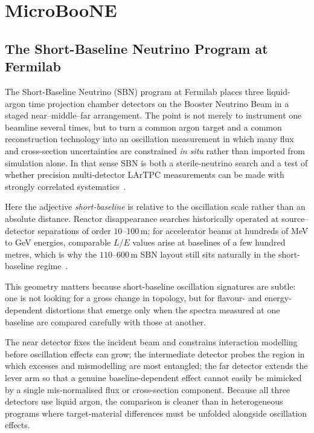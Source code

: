 \chapter{MicroBooNE}

\section{The Short-Baseline Neutrino Program at Fermilab}

The Short-Baseline Neutrino (SBN) program at Fermilab places three liquid-argon
time projection chamber detectors on the Booster Neutrino Beam in a staged
near--middle--far arrangement. The point is not merely to instrument one
beamline several times, but to turn a common argon target and a common
reconstruction technology into an oscillation measurement in which many flux
and cross-section uncertainties are constrained \emph{in situ} rather than
imported from simulation alone. In that sense SBN is both a sterile-neutrino
search and a test of whether precision multi-detector LArTPC measurements can
be made with strongly correlated systematics~\cite{Brailsford:2017rxe,MicroBooNEProposal,Acciarri2017Future}.

Here the adjective \emph{short-baseline} is relative to the oscillation scale
rather than an absolute distance. Reactor disappearance searches historically
operated at source--detector separations of order
\(10\text{--}100\,\mathrm{m}\); for accelerator beams at hundreds of MeV to GeV
energies, comparable \(L/E\) values arise at baselines of a few hundred metres,
which is why the \(110\text{--}600\,\mathrm{m}\) SBN layout still sits
naturally in the short-baseline regime~\cite{GiuntiKim2007,Brailsford:2017rxe}.

This geometry matters because short-baseline oscillation signatures are subtle:
one is not looking for a gross change in topology, but for flavour- and
energy-dependent distortions that emerge only when the spectra measured at one
baseline are compared carefully with those at another.

The near detector fixes the incident beam and constrains interaction modelling before oscillation
effects can grow; the intermediate detector probes the region in which excesses
and mismodelling are most entangled; the far detector extends the lever arm so
that a genuine baseline-dependent effect cannot easily be mimicked by a single
mis-normalised flux or cross-section component. Because all three detectors use
liquid argon, the comparison is cleaner than in heterogeneous programs where
target-material differences must be unfolded alongside oscillation effects.

